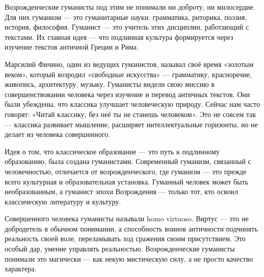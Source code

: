 Возрожденческие гуманисты под этим не понимали ни доброту, ни милосердие. Для них гуманизм --- это гуманитарные науки: грамматика, риторика, поэзия, история, философия. Гуманист --- это учитель этих дисциплин, работающий с текстами. Их главная идея --- что подлинная культура формируется через изучение текстов античной Греции и Рима.

Марсилий Фичино, один из ведущих гуманистов, называл своё время «золотым веком», который возродил «свободные искусства» --- грамматику, красноречие, живопись, архитектуру, музыку. Гуманисты видели свою миссию в совершенствовании человека через изучение и перевод античных текстов. Они были убеждены, что классика улучшает человеческую природу. Сейчас нам часто говорят: «Читай классику, без неё ты не станешь человеком». Это не совсем так --- классика развивает мышление, расширяет интеллектуальные горизонты, но не делает из человека совершенного.

Идея о том, что классическое образование --- это путь к подлинному образованию, была создана гуманистами. Современный гуманизм, связанный с человечностью, отличается от возрожденческого, где гуманизм --- это прежде всего культурная и образовательная установка. Гуманный человек может быть необразованным, а гуманист эпохи Возрождения --- только тот, кто освоил классическую литературу и культуру.

Совершенного человека гуманисты называли homo virtuoso. Виртус --- это не добродетель в обычном понимании, а способность воинов античности подчинять реальность своей воле, переламывать ход сражения своим присутствием. Это особый дар, умение управлять реальностью. Возрожденческие гуманисты понимали это магически --- как некую мистическую силу, а не просто качество характера.

